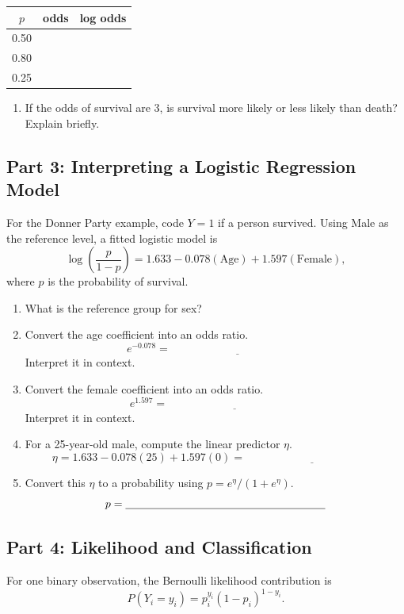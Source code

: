 \documentclass{article}
\newcommand{\blankline}[1]{\underline{\hspace{#1}}}
\begin{document}
\begin{center}
\renewcommand{\arraystretch}{1.6}
\begin{tabular}{ccc}
\toprule
\boldmath$p$ & \textbf{odds} & \textbf{log odds} \\
\midrule
0.50 & & \\[1.8em]
0.80 & & \\[1.8em]
0.25 & & \\
\bottomrule
\end{tabular}
\end{center}

\begin{enumerate}[label={\bfseries (\Alph*)},itemsep=.8em]
\item If the odds of survival are 3, is survival more likely or less likely than death? Explain briefly. \\[3em]
\end{enumerate}

\subsection*{Part 3: Interpreting a Logistic Regression Model}
For the Donner Party example, code $Y=1$ if a person survived. Using Male as the reference level, a fitted logistic model is
\[
\log\left(\frac{p}{1-p}\right) = 1.633 - 0.078(\text{Age}) + 1.597(\text{Female}),
\]
where $p$ is the probability of survival.

\begin{enumerate}[label={\bfseries (\Alph*)},itemsep=.8em]
\item What is the reference group for sex? \\[2em]
\item Convert the age coefficient into an odds ratio.
\[
e^{-0.078}=\blankline{2in}
\]
Interpret it in context. \\[3.5em]
\item Convert the female coefficient into an odds ratio.
\[
e^{1.597}=\blankline{2in}
\]
Interpret it in context. \\[3.5em]
\item For a 25-year-old male, compute the linear predictor $\eta$.
\[
\eta = 1.633 - 0.078(25) + 1.597(0)=\blankline{2in}
\]
\item Convert this $\eta$ to a probability using $p=e^\eta/(1+e^\eta)$.
\[
p = \blankline{2.5in}
\]
\end{enumerate}

\subsection*{Part 4: Likelihood and Classification}
For one binary observation, the Bernoulli likelihood contribution is
\[
P(Y_i=y_i)=p_i^{y_i}(1-p_i)^{1-y_i}.
\]
\end{document}
